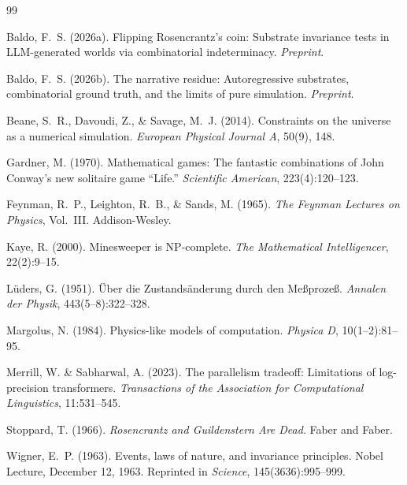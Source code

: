 \documentclass[12pt,a4paper]{article}
\theoremstyle{definition}
\theoremstyle{remark}
\begin{document}
\begin{thebibliography}{99}

Baldo, F.~S. (2026a).
\newblock Flipping {R}osencrantz's coin: Substrate invariance tests in
  {LLM}-generated worlds via combinatorial indeterminacy.
\newblock \textit{Preprint}.

Baldo, F.~S. (2026b).
\newblock The narrative residue: Autoregressive substrates, combinatorial
  ground truth, and the limits of pure simulation.
\newblock \textit{Preprint}.

Beane, S.~R., Davoudi, Z., \& Savage, M.~J. (2014).
\newblock Constraints on the universe as a numerical simulation.
\newblock \textit{European Physical Journal A}, 50(9), 148.

Gardner, M. (1970).
\newblock Mathematical games: The fantastic combinations of {J}ohn {C}onway's
  new solitaire game ``{L}ife.''
\newblock \textit{Scientific American}, 223(4):120--123.

Feynman, R.~P., Leighton, R.~B., \& Sands, M. (1965).
\newblock \textit{The Feynman Lectures on Physics}, Vol.~III.
\newblock Addison-Wesley.

Kaye, R. (2000).
\newblock Minesweeper is {NP}-complete.
\newblock \textit{The Mathematical Intelligencer}, 22(2):9--15.

Lüders, G. (1951).
\newblock Über die Zustandsänderung durch den Meßprozeß.
\newblock \textit{Annalen der Physik}, 443(5--8):322--328.

Margolus, N. (1984).
\newblock Physics-like models of computation.
\newblock \textit{Physica D}, 10(1--2):81--95.

Merrill, W. \& Sabharwal, A. (2023).
\newblock The parallelism tradeoff: Limitations of log-precision transformers.
\newblock \textit{Transactions of the Association for Computational
  Linguistics}, 11:531--545.

Stoppard, T. (1966).
\newblock \textit{Rosencrantz and Guildenstern Are Dead}.
\newblock Faber and Faber.

Wigner, E.~P. (1963).
\newblock Events, laws of nature, and invariance principles.
\newblock Nobel Lecture, December 12, 1963.
\newblock Reprinted in \textit{Science}, 145(3636):995--999.


\end{thebibliography}
\end{document}
